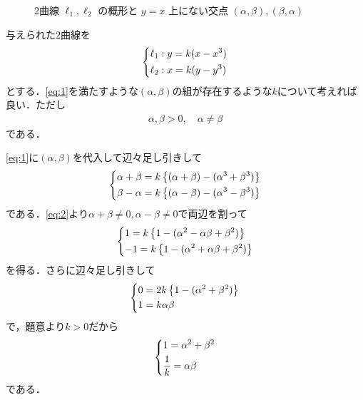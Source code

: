 \documentclass[../../main.tex]{subfiles}
\begin{document}
\begin{figure}[htb]
  \caption{2曲線 $\ell_1, \ell_2$ の概形と $y=x$ 上にない交点 $(\alpha, \beta), (\beta, \alpha)$}
  \label{fig:curves_l1_l2}
\end{figure}

与えられた$2$曲線を
\begin{align}
  \begin{dcases}
    \ell_1: y = k(x-x^3) \\
    \ell_2: x = k(y-y^3)
  \end{dcases} \label{eq:1}
\end{align}
とする．\cref{eq:1}を満たすような$(\alpha,\beta)$の組が存在するような$k$について考えれば良い．ただし
\begin{align}
  \alpha,\beta > 0, \quad \alpha \neq \beta \label{eq:2}
\end{align}
である．

\cref{eq:1}に$(\alpha,\beta)$を代入して辺々足し引きして
\begin{align}
  \begin{dcases}
    \alpha+\beta=k\left\{(\alpha+\beta)-(\alpha^3+\beta^3)\right\} \\
    \beta-\alpha=k\left\{(\alpha-\beta)-(\alpha^3-\beta^3)\right\}
  \end{dcases}
\end{align}
である．\cref{eq:2}より$\alpha+\beta \neq 0, \alpha-\beta \neq 0$で両辺を割って
\begin{align}
  \begin{dcases}
    1=k\left\{1-(\alpha^2-\alpha\beta+\beta^2)\right\} \\
    -1=k\left\{1-(\alpha^2+\alpha\beta+\beta^2)\right\}
  \end{dcases}
\end{align}
を得る．さらに辺々足し引きして
\begin{align}
  \begin{dcases}
    0=2k\left\{1-(\alpha^2+\beta^2)\right\} \\
    1=k\alpha\beta
  \end{dcases}
\end{align}
で，題意より$k > 0$だから
\begin{align}
  \begin{dcases}
    1 = \alpha^2+\beta^2 \\
    \dfrac{1}{k}=\alpha\beta
  \end{dcases} \label{eq:3}
\end{align}
である．
\end{document}
